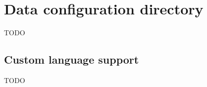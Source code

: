 \section{Data configuration directory}\label{section:data-config}

TODO


\subsection{Custom language support}\label{sub:config-labels}

TODO

\vfill\newpage